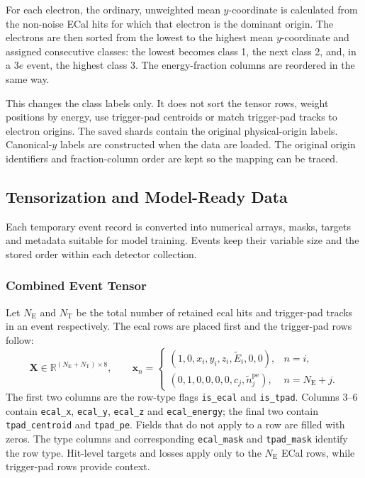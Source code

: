 For each electron, the ordinary, unweighted mean \(y\)-coordinate is calculated
from the non-noise ECal hits for which that electron is the dominant origin.
The electrons are then sorted from the lowest to the highest mean
\(y\)-coordinate and assigned consecutive classes: the lowest becomes class
1, the next class 2, and, in a \(3e\) event, the highest class 3. The
energy-fraction columns are reordered in the same way.

This changes the class labels only. It does not sort the tensor rows, weight
positions by energy, use trigger-pad centroids or match trigger-pad tracks to
electron origins. The saved shards contain the original physical-origin
labels. Canonical-\(y\) labels are constructed when the data are loaded. The
original origin identifiers and fraction-column order are kept so the mapping
can be traced.

\subsection{Tensorization and Model-Ready Data}
\label{sec:method_features}

Each temporary event record is converted into numerical arrays, masks, targets and metadata suitable for model training. Events keep their variable size and the stored order within each detector collection. 

\subsubsection{Combined Event Tensor}

Let \(N_{\mathrm{E}}\) and \(N_{\mathrm{T}}\) be the total number of retained
\gls{ecal} hits and trigger-pad tracks in an event respectively. The \gls{ecal} rows are placed
first and the trigger-pad rows follow:
\begin{equation}
    \mathbf{X}
    \in
    \mathbb{R}^{(N_{\mathrm{E}}+N_{\mathrm{T}})\times 8},
    \qquad
    \mathbf{x}_n =
    \begin{cases}
        (1,0,x_i,y_i,z_i,\widetilde{E}_i,0,0),
        & n=i, \\[2mm]
        (0,1,0,0,0,0,c_j,\widetilde{n}^{\mathrm{pe}}_j),
        & n=N_{\mathrm{E}}+j .
    \end{cases}
    \label{eq:combined_event_tensor}
\end{equation}
The first two columns are the row-type flags \texttt{is\_ecal} and
\texttt{is\_tpad}. Columns 3--6 contain \texttt{ecal\_x},
\texttt{ecal\_y}, \texttt{ecal\_z} and \texttt{ecal\_energy}; the final two
contain \texttt{tpad\_centroid} and \texttt{tpad\_pe}. Fields that do not
apply to a row are filled with zeros. The type columns and corresponding
\texttt{ecal\_mask} and \texttt{tpad\_mask} identify the row type. Hit-level
targets and losses apply only to the \(N_{\mathrm{E}}\) ECal rows, while
trigger-pad rows provide context.


